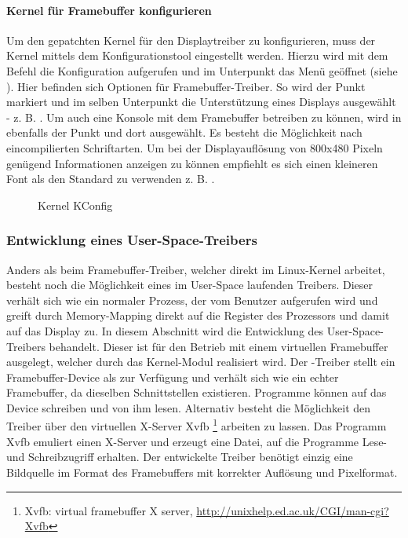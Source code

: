 \paragraph{Kernel für Framebuffer konfigurieren}
Um den gepatchten Kernel für den Displaytreiber zu konfigurieren, muss der Kernel mittels dem Konfigurationstool  eingestellt werden. 
Hierzu wird mit dem Befehl  die Konfiguration aufgerufen und im Unterpunkt  das Menü  geöffnet (siehe ). Hier befinden sich Optionen für Framebuffer-Treiber. So wird der Punkt  markiert und im selben Unterpunkt die Unterstützung eines Displays ausgewählt - z. B. . 
Um auch eine Konsole mit dem Framebuffer betreiben zu können, wird in  
ebenfalls der Punkt  und dort  ausgewählt. Es besteht die Möglichkeit nach eincompilierten Schriftarten. Um bei der Displayauflösung von 800x480 Pixeln genügend Informationen anzeigen zu können empfiehlt es sich einen kleineren Font als den Standard zu verwenden z. B. .
\begin{figure}[tbph]
	\centering
{}
	\caption{Kernel KConfig}
	\label{fig:kernel_config}
\end{figure}
\newpage
\subsubsection{Entwicklung eines User-Space-Treibers}
\label{cha:userspace}
Anders als beim Framebuffer-Treiber, welcher direkt im Linux-Kernel arbeitet, besteht noch die Möglichkeit eines im User-Space laufenden Treibers. Dieser verhält sich wie ein normaler Prozess, der vom Benutzer aufgerufen wird und greift durch Memory-Mapping direkt auf die Register des Prozessors und damit auf das Display zu.
In diesem Abschnitt wird die Entwicklung des User-Space-Treibers behandelt. 
Dieser ist für den Betrieb mit einem virtuellen Framebuffer ausgelegt, welcher durch das Kernel-Modul  realisiert wird. Der -Treiber stellt ein Framebuffer-Device als  zur Verfügung und verhält sich wie ein echter Framebuffer, da dieselben Schnittstellen existieren. Programme können auf das Device schreiben und von ihm lesen. Alternativ besteht die Möglichkeit den Treiber über den virtuellen X-Server Xvfb \footnote{Xvfb: virtual framebuffer X server, \url{http://unixhelp.ed.ac.uk/CGI/man-cgi?Xvfb}} arbeiten zu lassen. Das Programm Xvfb emuliert einen X-Server und erzeugt eine Datei, auf die Programme Lese- und Schreibzugriff erhalten. Der entwickelte Treiber benötigt einzig eine Bildquelle im Format des Framebuffers mit korrekter Auflösung und Pixelformat. 


